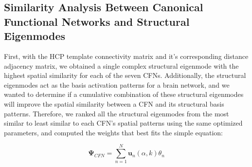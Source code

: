 \documentclass{article}
\begin{document}
\subsection{Similarity Analysis Between Canonical Functional Networks and Structural Eigenmodes}

First, with the HCP template connectivity matrix and it's corresponding distance adjacency matrix, we obtained a single complex structural eigenmode with the highest spatial similarity for each of the seven CFNs. Additionally, the structural eigenmodes act as the basis activation patterns for a brain network, and we wanted to determine if a cumulative combination of these structural eigenmodes will improve the spatial similarity between a CFN and its structural basis patterns. Therefore, we ranked all the structural eigenmodes from the most similar to least similar to each CFN's spatial patterns using the same optimized parameters, and computed the weights that best fits the simple equation:

\begin{equation}
    \mathbf{\Psi}_{CFN} = \sum_{n = 1}^{N} \mathbf{u}_{n}(\alpha,k) \theta_{n}
\end{equation}
\end{document}
